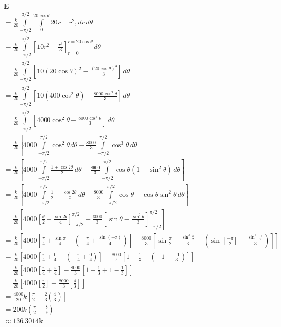\documentclass[12pt]{exam}
\begin{document}
\begin{questions}
\begin{enumerate}[a)]
  \begin{align*}
    &\mathbf{E}\\
    &= \frac{k}{20}\int\limits_{-\pi/2}^{\pi/2}\int\limits_{0}^{20\cos{\theta}} 20r-r^2,dr\,d\theta \\
    &= \frac{k}{20}\int\limits_{-\pi/2}^{\pi/2}\left[10r^2-\frac{r^3}{3}\right]_{r=0}^{r=20\cos{\theta}}\,d\theta \\
    &= \frac{k}{20}\int\limits_{-\pi/2}^{\pi/2}\left[10(20\cos{\theta})^2-\frac{(20\cos{\theta})^3}{3}\right]\,d\theta \\
    &= \frac{k}{20}\int\limits_{-\pi/2}^{\pi/2}\left[10(400\cos^2{\theta})-\frac{8000\cos^3{\theta}}{3}\right]\,d\theta \\
    &= \frac{k}{20}\int\limits_{-\pi/2}^{\pi/2}\left[4000\cos^2{\theta}-\frac{8000\cos^3{\theta}}{3}\right]\,d\theta \\
    &= \frac{k}{20}\left[4000\int\limits_{-\pi/2}^{\pi/2}\cos^2{\theta}\,d\theta-\frac{8000}{3}\int\limits_{-\pi/2}^{\pi/2}\cos^3{\theta}\,d\theta\right] \\
    &= \frac{k}{20}\left[4000\int\limits_{-\pi/2}^{\pi/2}\frac{1+\cos{2\theta}}{2}\,d\theta-\frac{8000}{3}\int\limits_{-\pi/2}^{\pi/2}\cos{\theta}(1-\sin^2{\theta})\,d\theta\right] \\
    &= \frac{k}{20}\left[4000\int\limits_{-\pi/2}^{\pi/2}\frac{1}{2}+\frac{\cos{2\theta}}{2}\,d\theta-\frac{8000}{3}\int\limits_{-\pi/2}^{\pi/2}\cos{\theta}-\cos{\theta}\sin^2{\theta}\,d\theta\right] \\
    &= \frac{k}{20}\left[4000\left[\frac{\theta}{2}+\frac{\sin{2\theta}}{4}\right]_{-\pi/2}^{\pi/2}-\frac{8000}{3}\left[\sin{\theta}-\frac{\sin^3{\theta}}{3}\right]_{-\pi/2}^{\pi/2}\right] \\
    &= \frac{k}{20}\left[4000\left[\frac{\pi}{4}+\frac{\sin{\pi}}{4}-\left(-\frac{\pi}{4}+\frac{\sin{(-\pi)}}{4}\right)\right]-\frac{8000}{3}\left[\sin{\frac{\pi}{2}}-\frac{\sin^3{\frac{\pi}{2}}}{3}-\left(\sin{\left[\frac{-\pi}{2}\right]}-\frac{\sin^3{\frac{-\pi}{2}}}{3}\right)\right]\right] \\
    &= \frac{k}{20}\left[4000\left[\frac{\pi}{4}+\frac{0}{4}-\left(-\frac{\pi}{4}+\frac{0}{4}\right)\right]-\frac{8000}{3}\left[1-\frac{1}{3}-\left(-1-\frac{-1}{3}\right)\right]\right] \\
    &= \frac{k}{20}\left[4000\left[\frac{\pi}{4}+\frac{\pi}{4}\right]-\frac{8000}{3}\left[1-\frac{1}{3}+1-\frac{1}{3}\right]\right] \\
    &= \frac{k}{20}\left[4000\left[\frac{\pi}{2}\right]-\frac{8000}{3}\left[\frac{4}{3}\right]\right] \\
    &= \frac{4000}{20}k\left[\frac{\pi}{2}-\frac{2}{3}\left(\frac{4}{3}\right)\right] \\
    &= 200k \left(\frac{\pi}{2}-\frac{8}{9}\right) \\
    &\mathbf{\approx 136.3014 k}
  \end{align*}


\end{enumerate}
\end{questions}
\end{document}
